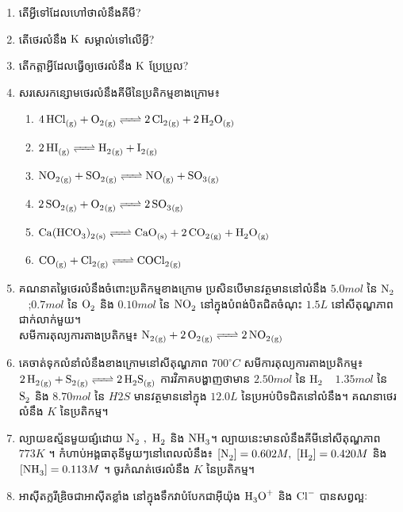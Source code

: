 \documentclass[13pt, a4paper]{article}
\begin{document}
\maketitle
\begin{enumerate}[m]
	\item តើអ្វីទៅដែលហៅថាលំនឹងគីមី?
	\item តើថេរលំនឹង $\ce{K}$ សម្គាល់ទៅលើអ្វី?
	\item តើកត្តាអ្វីដែលធ្វើឲ្យថេរលំនឹង $\ce{K}$ ប្រែប្រួល?
	\item សរសេរកន្សោមថេរលំនឹងគីមីនៃប្រតិកម្មខាងក្រោម៖
	\begin{enumerate}[k]
		\item $ \ce{4HCl_{(g)} + O2_{(g)} <=> 2Cl2_{(g)} + 2H2O_{(g)}} $
		\item 
		$ \ce{2HI_{(g)} <=> H2_{(g)} + I2_{(g)}} $
		\item $\ce{ NO2_{\left(g\right)} + SO2_{\left(g\right)} <=> NO_{\left(g\right)} + SO3_{\left(g\right)}}$
		\item $\ce{ 2SO2_{\left(g\right)} + O2_{\left(g\right)} <=> 2SO3_{\left(g\right)}}$
		\item $\ce{ Ca(HCO3)2_{\left(s\right)} <=> CaO_{\left(s\right)} + 2CO2_{\left(g\right)} + H2O_{\left(g\right)}}$
		\item $\ce{CO_{\left(g\right)} + Cl2_{\left(g\right)} <=> COCl2_{\left(g\right)}}$
	\end{enumerate}
	\item គណនាតម្លៃថេរលំនឹងចំពោះប្រតិកម្មខាងក្រោម ប្រសិនបើមានវត្ថមាននៅលំនឹង $5.0mol$ នៃ $\ce{N2}$~ ;$0.7mol$ នៃ $\ce{O2}$ និង $0.10mol$ នៃ $\ce{NO2}$ នៅក្នុងបំពង់បិតជិតចំណុះ $1.5L$ នៅសីតុណ្ហភាពជាក់លាក់មួយ។\\
	សមីការតុល្យការតាងប្រតិកម្ម៖ $\ce{N2_{\left(g\right)} + 2O2_{\left(g\right)} <=> 2NO2_{\left(g\right)}}$
	\item គេចាត់ទុកលំនាំលំនឹងខាងក្រោមនៅសីតុណ្ហភាព $700^\circ C$ សមីការតុល្យការតាងប្រតិកម្ម៖ $\ce{2H2_{\left(g\right)} + S2_{\left(g\right)} <=> 2H2S_{\left(g\right)}}$ ការវិភាគបង្ហាញថាមាន $2.50mol$ នៃ $\ce{H2}$~~$1.35mol$ នៃ $\ce{S2}$ និង $8.70mol$ នៃ $H2S$ មានវត្ថមាននៅក្នុង $12.0L$ នៃប្រអប់បិទជិតនៅលំនឹង។ គណនាថេរលំនឹង $K$ នៃប្រតិកម្ម។
	\item ល្យាយឧស្ម័នមួយផ្សំដោយ $\ce{N2}~,~\ce{H2}$ និង $\ce{NH3}$។ ល្បាយនេះមានលំនឹងគីមីនៅសីតុណ្ហភាព $773K$ ។ កំហាប់អង្គធាតុនីមួយៗនៅពេលលំនឹង៖ $\left[\ce{N2}\right]=0.602M,~\left[\ce{H2}\right]=0.420M$ និង $\left[\ce{NH3}\right]=0.113M$ ។ ចូរកំណត់ថេរលំនឹង $K$ នៃប្រតិកម្ម។
	\item អាស៊ីតក្លរីឌ្រិចជាអាស៊ីតខ្លាំង នៅក្នុងទឹកវាបំបែកជាអ៊ីយ៉ុង $\ce{H3O+}$ និង $\ce{Cl-}$ បានសព្វល្អៈ~~\\

\end{enumerate}
\end{document}
